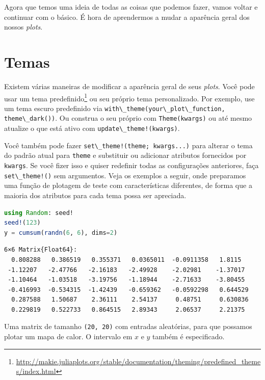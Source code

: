 \documentclass[
  notoc %
]{tufte-book}
\DeclareRobustCommand{\href}[2]{#2\footnote{\url{#1}}}
\newcommand{\passthrough}[1]{#1}
\begin{document}
Agora que temos uma ideia de todas as coisas que podemos fazer, vamos
voltar e continuar com o básico. É hora de aprendermos a mudar a
aparência geral dos nossos \emph{plots}.

\hypertarget{sec:themes}{%
\section{Temas}\label{sec:themes}}

Existem várias maneiras de modificar a aparência geral de seus
\emph{plots}. Você pode usar um
\href{http://makie.juliaplots.org/stable/documentation/theming/predefined_themes/index.html}{tema
predefinido} ou seu próprio tema personalizado. Por exemplo, use um tema
escuro predefinido via
\passthrough{\lstinline!with\_theme(your\_plot\_function, theme\_dark())!}.
Ou construa o seu próprio com \passthrough{\lstinline!Theme(kwargs)!} ou
até mesmo atualize o que está ativo com
\passthrough{\lstinline"update\_theme!(kwargs)"}.

Você também pode fazer
\passthrough{\lstinline"set\_theme!(theme; kwargs...)"} para alterar o
tema do padrão atual para \passthrough{\lstinline!theme!} e substituir
ou adicionar atributos fornecidos por \passthrough{\lstinline!kwargs!}.
Se você fizer isso e quiser redefinir todas as configurações anteriores,
faça \passthrough{\lstinline"set\_theme!()"} sem argumentos. Veja os
exemplos a seguir, onde preparamos uma função de plotagem de teste com
características diferentes, de forma que a maioria dos atributos para
cada tema possa ser apreciada.

\begin{lstlisting}[language=Julia]
using Random: seed!
seed!(123)
y = cumsum(randn(6, 6), dims=2)
\end{lstlisting}

\begin{lstlisting}[language=Output]
6×6 Matrix{Float64}:
  0.808288   0.386519   0.355371   0.0365011  -0.0911358   1.8115
 -1.12207   -2.47766   -2.16183   -2.49928    -2.02981    -1.37017
 -1.10464   -1.03518   -3.19756   -1.18944    -2.71633    -3.80455
 -0.416993  -0.534315  -1.42439   -0.659362   -0.0592298   0.644529
  0.287588   1.50687    2.36111    2.54137     0.48751     0.630836
  0.229819   0.522733   0.864515   2.89343     2.06537     2.21375
\end{lstlisting}

Uma matrix de tamanho \passthrough{\lstinline!(20, 20)!} com entradas
aleatórias, para que possamos plotar um mapa de calor. O intervalo em
\(x\) e \(y\) também é especificado.
\end{document}

